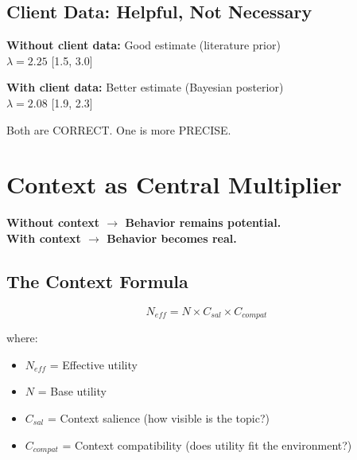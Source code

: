 \subsection{Client Data: Helpful, Not Necessary}

\begin{tcolorbox}[colback=blue!5!white, colframe=blue!75!black]
\textbf{Without client data:} Good estimate (literature prior) \\
$\lambda = 2.25$ [1.5, 3.0]

\textbf{With client data:} Better estimate (Bayesian posterior) \\
$\lambda = 2.08$ [1.9, 2.3]

Both are CORRECT. One is more PRECISE.
\end{tcolorbox}


\section{Context as Central Multiplier}
\label{sec:ref-ebf-context}

\begin{tcolorbox}[colback=red!5!white, colframe=red!75!black,
    title=The Context Principle]
\textbf{Without context $\rightarrow$ Behavior remains potential.} \\
\textbf{With context $\rightarrow$ Behavior becomes real.}
\end{tcolorbox}

\subsection{The Context Formula}

\begin{equation}
N_{eff} = N \times C_{sal} \times C_{compat}
\end{equation}

where:
\begin{itemize}[nosep]
\item $N_{eff}$ = Effective utility
\item $N$ = Base utility
\item $C_{sal}$ = Context salience (how visible is the topic?)
\item $C_{compat}$ = Context compatibility (does utility fit the environment?)
\end{itemize}

